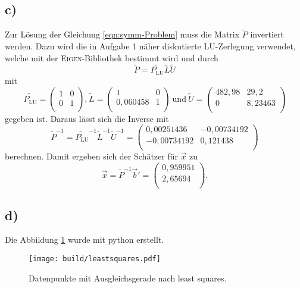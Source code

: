\subsection{c)}
Zur Lösung der Gleichung \eqref{eqn:symm-Problem} muss die Matrix $\tilde{P}$ invertiert
werden. Dazu wird die in Aufgabe 1 näher diskutierte LU-Zerlegung verwendet,
welche mit der \textsc{Eigen}-Bibliothek bestimmt wird und durch
\begin{equation*}
  \tilde{P} = \tilde{P_\text{LU}} \tilde{L} \tilde{U}
\end{equation*}
mit
\begin{equation*}
  \tilde{P_\text{LU}} =
  \begin{pmatrix}
    1 & 0 \\
    0 & 1 \\
  \end{pmatrix}
  \text{,} \ \tilde{L} =
  \begin{pmatrix}
    1 & 0 \\
    0,060458 & 1 \\
  \end{pmatrix}
  \ \text{und} \ \tilde{U} =
  \begin{pmatrix}
    482,98 & 29,2 \\
    0 & 8,23463 \\
  \end{pmatrix}
\end{equation*}
gegeben ist. Daraus lässt sich die Inverse mit
\begin{equation*}
  \tilde{P}^{-1} = \tilde{P_\text{LU}}^{-1} \tilde{L}^{-1} \tilde{U}^{-1} =
  \begin{pmatrix}
    0,00251436 & -0,00734192 \\
    -0,00734192 & 0,121438 \\
  \end{pmatrix}
\end{equation*}
berechnen. Damit ergeben sich der Schätzer für $\vec{x}$ zu
\begin{equation*}
  \vec{x} = \tilde{P}^{-1} \vec{b}' =
  \begin{pmatrix}
    0,959951 \\
    2,65694 \\
  \end{pmatrix}
  .
\end{equation*}

\subsection{d)}
Die Abbildung \ref{fig:leastsquares} wurde mit python erstellt.
\begin{figure}
  \centering
  \texttt{[image: build/leastsquares.pdf]}  %
  \caption{Datenpunkte mit Ausgleichsgerade nach least squares.}
  \label{fig:leastsquares}
\end{figure}

